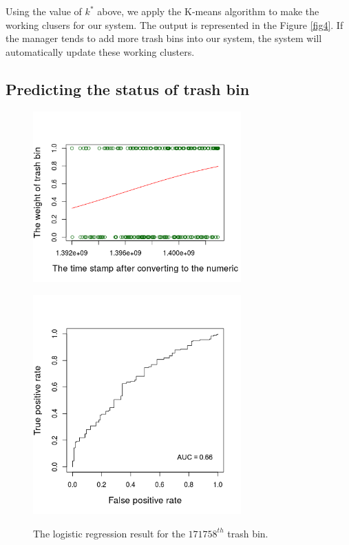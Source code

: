 \documentclass[conference]{IEEEtran}
\begin{document}
\par Using the value of $k^*$ above, we apply the K-means algorithm to make the working clusers for our system. The output is represented in the Figure \ref{fig4}. If the manager tends to add more trash bins into our system, the system will automatically update these working clusters.




\subsection{Predicting the status of trash bin} 
\begin{figure}
	\centering
	
	\begin{minipage}{8cm}
		\includegraphics[width=8cm]{regression}
		\label{fig5a}
	\end{minipage}
	\begin{minipage}{8cm}
		\includegraphics[width=8cm]{AUC}
		\label{fig5b}
	\end{minipage}
	\label{fig5}
	\caption{The logistic regression result for the $171758^{th}$ trash bin.}
\end{figure}
\end{document}
